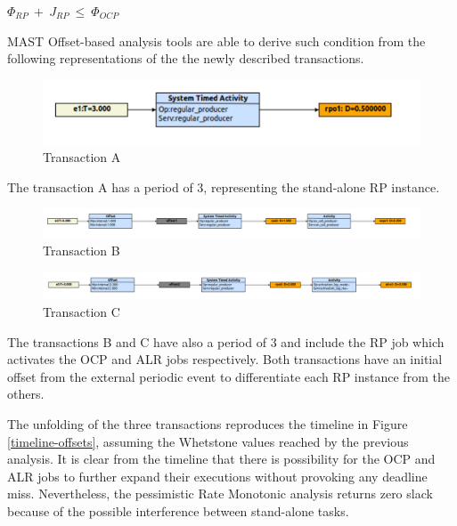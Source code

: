 \documentclass{article}
\begin{document}
$\Phi_{RP}\ +\ J_{RP}\ \le\ \Phi_{OCP}$

MAST Offset-based analysis tools are able to derive such condition from the following representations of the the newly described transactions.

\begin{figure}[!htbp]
\centering
\includegraphics[width=5in]{images/transaction-rp-offset}
\caption{Transaction A}
\label{transaction-rp-offset}
\end{figure}

The transaction A has a period of 3, representing the stand-alone RP instance.

\begin{figure}[!htbp]
\centering
\includegraphics[width=6.5in]{images/transaction-ocp-offset}
\caption{Transaction B}
\label{transaction-ocp-offset}
\end{figure}

\begin{figure}[!htbp]
\centering
\includegraphics[width=6.5in]{images/transaction-alr-offset}
\caption{Transaction C}
\label{transaction-alr-offset}
\end{figure}

The transactions B and C have also a period of 3 and include the RP job which activates the OCP and ALR jobs respectively. Both transactions have an initial offset from the external periodic event to differentiate each RP instance from the others.

The unfolding of the three transactions reproduces the timeline in Figure \ref{timeline-offsets}, assuming the Whetstone values reached by the previous analysis. It is clear from the timeline that there is possibility for the OCP and ALR jobs to further expand their executions without provoking any deadline miss. Nevertheless, the pessimistic Rate Monotonic analysis returns zero slack because of the possible interference between stand-alone tasks.
\end{document}
